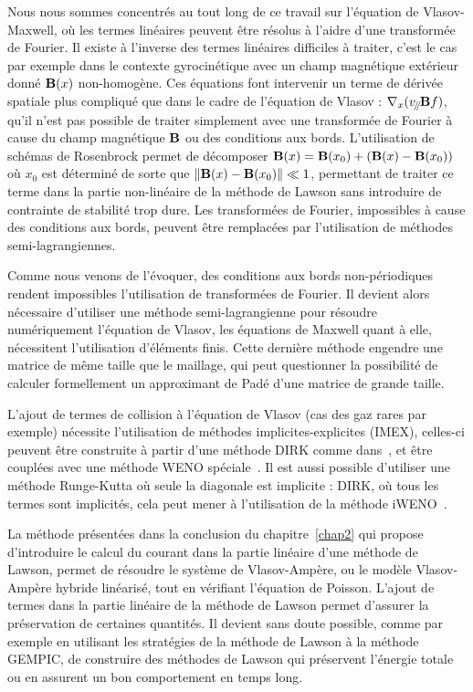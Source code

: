 Nous nous sommes concentrés au tout long de ce travail sur l'équation de Vlasov-Maxwell, où les termes linéaires peuvent être résolus à l'aidre d'une transformée de Fourier. Il existe à l'inverse des termes linéaires difficiles à traiter, c'est le cas par exemple dans le contexte gyrocinétique avec un champ magnétique extérieur donné $\vb{B}(x)$ non-homogène. Ces équations font intervenir un terme de dérivée spatiale plus compliqué que dans le cadre de l'équation de Vlasov : $\nabla_{x}(v_{\mathbin{\!/\mkern-5mu/\!}}\vb{B}f)$, qu'il n'est pas possible de traiter simplement avec une transformée de Fourier à cause du champ magnétique $\vb{B}$ ou des conditions aux bords. L'utilisation de schémas de Rosenbrock permet de décomposer $\vb{B}(x) = \vb{B}(x_0) + ( \vb{B}(x)-\vb{B}(x_0) )$ où $x_0$ est déterminé de sorte que $\|\vb{B}(x)-\vb{B}(x_0)\| \ll 1$, permettant de traiter ce terme dans la partie non-linéaire de la méthode de Lawson sans introduire de contrainte de stabilité trop dure. Les transformées de Fourier, impossibles à cause des conditions aux bords, peuvent être remplacées par l'utilisation de méthodes semi-lagrangiennes.


Comme nous venons de l'évoquer, des conditions aux bords non-périodiques rendent impossibles l'utilisation de transformées de Fourier. Il devient alors nécessaire d'utiliser une méthode semi-lagrangienne pour résoudre numériquement l'équation de Vlasov, les équations de Maxwell quant à elle, nécessitent l'utilisation d'éléments finis. Cette dernière méthode engendre une matrice de même taille que le maillage, qui peut questionner la possibilité de calculer formellement un approximant de Padé d'une matrice de grande taille.

L'ajout de termes de collision à l'équation de Vlasov (cas des gaz rares par exemple) nécessite l'utilisation de méthodes implicites-explicites (IMEX), celles-ci peuvent être construite à partir d'une méthode DIRK comme dans~\cite{Cho:2021}, et être couplées avec une méthode WENO spéciale~\cite{Boscarino:2019}. Il est aussi possible d'utiliser une méthode Runge-Kutta où seule la diagonale est implicite : DIRK, où tous les termes sont implicités, cela peut mener à l'utilisation de la méthode iWENO~\cite{Gottlieb:2006}.

La méthode présentées dans la conclusion du chapitre~\ref{chap2} qui propose d'introduire le calcul du courant dans la partie linéaire d'une méthode de Lawson, permet de résoudre le système de Vlasov-Ampère, ou le modèle Vlasov-Ampère hybride linéarisé, tout en vérifiant l'équation de Poisson. L'ajout de termes dans la partie linéaire de la méthode de Lawson permet d'assurer la préservation de certaines quantités. Il devient sans doute possible, comme par exemple en utilisant les stratégies de la méthode de Lawson à la méthode GEMPIC, de construire des méthodes de Lawson qui préservent l'énergie totale ou en assurent un bon comportement en temps long.

